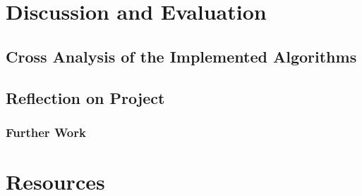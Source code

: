 \chapter{Discussion and Evaluation}
\section{Cross Analysis of the Implemented Algorithms}


\section{Reflection on Project}
\subsection{Further Work}


\chapter{Resources}

\nocite{*}




